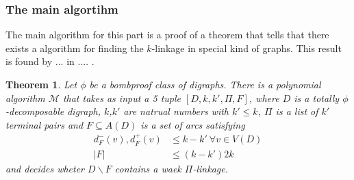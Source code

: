 \documentclass{beamer}
\newtheorem{thm}{Theorem}[section]
\begin{document}
\begin{frame}
    \frametitle{The main algortihm}
    The main algorithm for this part is a proof of a theorem that tells that there exists a algorithm for finding the $k$-linkage in special kind of graphs. This result is found by ... in .... .
\begin{thm}
    Let $\phi$ be a bombproof class of digraphs. There is a polynomial algorithm $\mathcal{M}$ that takes as input a 5 tuple $[D,k,k',\Pi, F]$, where $D$ is a totally $\phi$-decomposable digraph, $k$,$k'$ are natrual numbers with $k'\leq k$, $\Pi$ is a list of $k'$ terminal pairs and $F\subseteq A(D)$ is a set of arcs satisfying
    \begin{align}
        d^-_F(v),d^+_F(v)&\leq k-k' \ \forall v\in V(D)\\
        |F|&\leq (k-k')2k \nonumber
    \end{align}
    and decides wheter $D\backslash F$ contains a waek $\Pi$-linkage.
    \label{thm:mainalgo}
\end{thm}
\end{frame}
\end{document}

